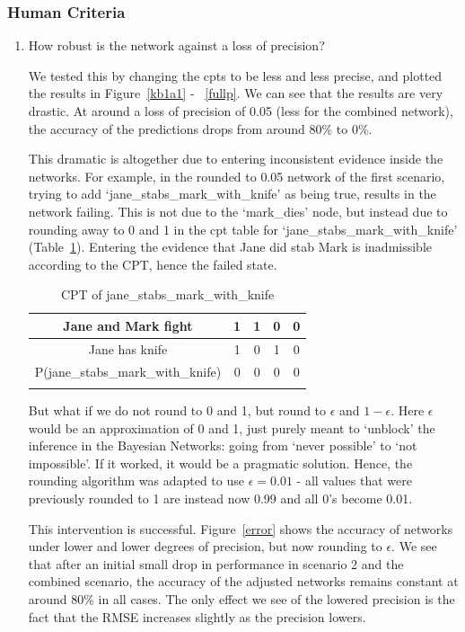 \subsubsection{Human Criteria}
\begin{enumerate}


\item How robust is the network against a loss of precision?

We tested this by changing the cpts to be less and less precise, and plotted the results in Figure~\ref{kb1a1} - ~\ref{fullp}. We can see that the results are very drastic. At around a loss of precision of 0.05 (less for the combined network), the accuracy of the predictions drops from around 80\% to 0\%. 

This dramatic is altogether due to entering inconsistent evidence inside the networks. For example, in the rounded to 0.05 network of the first scenario, trying to add `jane\_stabs\_mark\_with\_knife' as being true, results in the network failing. This is not due to the `mark\_dies' node, but instead due to rounding away to 0 and 1 in the cpt table for `jane\_stabs\_mark\_with\_knife' (Table~\ref{stab}). Entering the evidence that Jane did stab Mark is inadmissible according to the CPT, hence the failed state.

\begin{table}
\begin{center}
\begin{tabular}{|c|c|c|c|c|}
 \hline
 Jane and Mark fight & 1 & 1 &0 & 0 \\
 \hline
 Jane has knife & 1 & 0 &1 & 0 \\
 \hline
  P(jane\_stabs\_mark\_with\_knife) & 0 & 0 &0 & 0 \\
  \hline
\label{stab}
\end{tabular}
\caption{CPT of jane\_stabs\_mark\_with\_knife}
\end{center}
\end{table}

But what if we do not round to 0 and 1, but round to $\epsilon$ and $1 - \epsilon$. Here $\epsilon$ would be an approximation of 0 and 1, just purely meant to `unblock' the inference in the Bayesian Networks: going from `never possible' to `not impossible'. If it worked, it would be a pragmatic solution. Hence, the rounding algorithm was adapted to use $\epsilon = 0.01$ - all values that were previously rounded to 1 are instead now 0.99 and all 0's become 0.01.

This intervention is successful. Figure~\ref{error} shows the accuracy of networks under lower and lower degrees of precision, but now rounding to $\epsilon$. We see that after an initial small drop in performance in scenario 2 and the combined scenario, the accuracy of the adjusted networks remains constant at around 80\% in all cases. The only effect we see of the lowered precision is the fact that the RMSE increases slightly as the precision lowers.


\end{enumerate}
